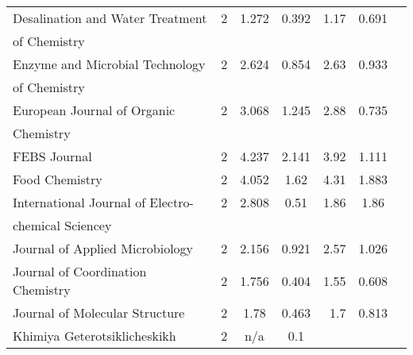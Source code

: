 \begin{longtable}[c]{lcccrcc}
 Desalination and Water Treatment                                                   & 2      & 1.272   & 0.392 &  1.17      & 0.691                 \\[0.5ex]
 of Chemistry                                                                       &        &         &       &            &                       \\[0.5ex]
 Enzyme and Microbial Technology                                                    & 2      & 2.624   & 0.854 &  2.63      & 0.933                 \\[0.5ex]
 of Chemistry                                                                       &        &         &       &            &                       \\[0.5ex]
 European Journal of Organic                                                        & 2      & 3.068   & 1.245 &  2.88      & 0.735                 \\[0.5ex]
 Chemistry                                                                          &        &         &       &            &                       \\[0.5ex]
 FEBS Journal                                                                       & 2      & 4.237   & 2.141 &  3.92      & 1.111                 \\[0.5ex]
 Food Chemistry                                                                     & 2      & 4.052   & 1.62  &  4.31      & 1.883                 \\[0.5ex]
 International Journal of Electro-                                                  & 2      & 2.808   & 0.51  &  1.86      & 1.86                  \\[0.5ex]
 chemical Sciencey                                                                  &        &         &       &            &                       \\[0.5ex]
 Journal of Applied Microbiology                                                    & 2      & 2.156   & 0.921 &  2.57      & 1.026                 \\[0.5ex]
 Journal of Coordination Chemistry                                                  & 2      & 1.756   & 0.404 &  1.55      & 0.608                 \\[0.5ex]
 Journal of Molecular Structure                                                     & 2      & 1.78    & 0.463 &  1.7       & 0.813                 \\[0.5ex]
 Khimiya Geterotsiklicheskikh                                                       & 2      & n/a     & 0.1   &            &                       \\[0.5ex]

\end{longtable}
